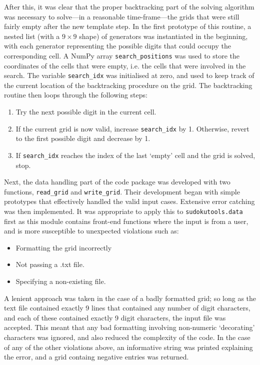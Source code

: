 \documentclass[12pt]{article}
\begin{document}
After this, it was clear that the proper backtracking part of the solving algorithm was necessary to solve---in a reasonable time-frame---the grids that were still fairly empty after the new template step.
In the first prototype of this routine, a nested list (with a $9\times9$ shape) of generators was instantiated in the beginning, with each generator representing the possible digits that could occupy the corresponding cell.
A NumPy array \texttt{search\_positions} was used to store the coordinates of the cells that were empty, i.e. the cells that were involved in the search.
The variable \texttt{search\_idx} was initialised at zero, and used to keep track of the current location of the backtracking procedure on the grid.
The backtracking routine then loops through the following steps:
\begin{enumerate}
    \item Try the next possible digit in the current cell.
    \item If the current grid is now valid, increase \texttt{search\_idx} by 1. Otherwise, revert to the first possible digit and decrease by 1.
    \item If \texttt{search\_idx} reaches the index of the last `empty' cell and the grid is solved, stop.
\end{enumerate}

Next, the data handling part of the code package was developed with two functions, \texttt{read\_grid} and \texttt{write\_grid}.
Their development began with simple prototypes that effectively handled the valid input cases.
Extensive error catching was then implemented.
It was appropriate to apply this to \texttt{sudokutools.data} first as this module contains front-end functions where the input is from a user, and is more susceptible to unexpected violations such as:
\begin{itemize}
    \item Formatting the grid incorrectly
    \item Not passing a .txt file.
    \item Specifying a non-existing file.
\end{itemize}
A lenient approach was taken in the case of a badly formatted grid; so long as the text file contained exactly 9 lines that contained any number of digit characters, and each of these contained exactly 9 digit characters, the input file was accepted.
This meant that any bad formatting involving non-numeric `decorating' characters was ignored, and also reduced the complexity of the code.
In the case of any of the other violations above, an informative string was printed explaining the error, and a grid containg negative entries was returned.
\end{document}
